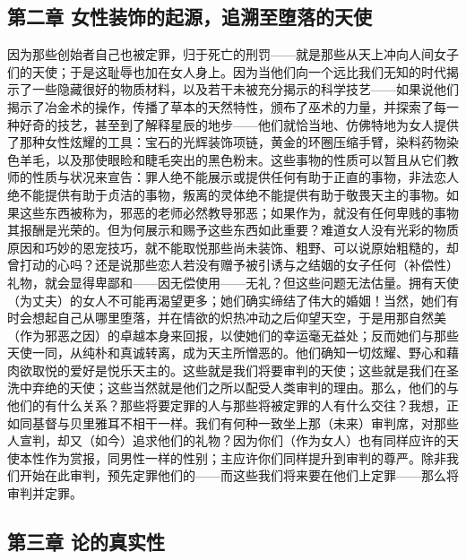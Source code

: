 \subsection{第二章 女性装饰的起源，追溯至堕落的天使}

因为那些创始者自己也被定罪，归于死亡的刑罚——就是那些从天上冲向人间女子们的天使；于是这耻辱也加在女人身上。因为当他们向一个远比我们无知的时代揭示了一些隐藏很好的物质材料，以及若干未被充分揭示的科学技艺——如果说他们揭示了冶金术的操作，传播了草本的天然特性，颁布了巫术的力量，并探索了每一种好奇的技艺，甚至到了解释星辰的地步——他们就恰当地、仿佛特地为女人提供了那种女性炫耀的工具：宝石的光辉装饰项链，黄金的环圈压缩手臂，染料药物染色羊毛，以及那使眼睑和睫毛突出的黑色粉末。这些事物的性质可以暂且从它们教师的性质与状况来宣告：罪人绝不能展示或提供任何有助于正直的事物，非法恋人绝不能提供有助于贞洁的事物，叛离的灵体绝不能提供有助于敬畏天主的事物。如果这些东西被称为，邪恶的老师必然教导邪恶；如果作为，就没有任何卑贱的事物其报酬是光荣的。但为何展示和赐予这些东西如此重要？难道女人没有光彩的物质原因和巧妙的恩宠技巧，就不能取悦那些尚未装饰、粗野、可以说原始粗糙的，却曾打动的心吗？还是说那些恋人若没有赠予被引诱与之结姻的女子任何（补偿性）礼物，就会显得卑鄙和——因无偿使用——无礼？但这些问题无法估量。拥有天使（为丈夫）的女人不可能再渴望更多；她们确实缔结了伟大的婚姻！当然，她们有时会想起自己从哪里堕落，并在情欲的炽热冲动之后仰望天空，于是用那自然美（作为邪恶之因）的卓越本身来回报，以使她们的幸运毫无益处；反而她们与那些天使一同，从纯朴和真诚转离，成为天主所憎恶的。他们确知一切炫耀、野心和藉肉欲取悦的爱好是悦乐天主的。这些就是我们将要审判的天使；这些就是我们在圣洗中弃绝的天使；这些当然就是他们之所以配受人类审判的理由。那么，他们的与他们的有什么关系？那些将要定罪的人与那些将被定罪的人有什么交往？我想，正如同基督与贝里雅耳不相干一样。我们有何种一致坐上那（未来）审判席，对那些人宣判，却又（如今）追求他们的礼物？因为你们（作为女人）也有同样应许的天使本性作为赏报，同男性一样的性别；主应许你们同样提升到审判的尊严。除非我们开始在此审判，预先定罪他们的——而这些我们将来要在他们上定罪——那么将审判并定罪。\par


\subsection{第三章 论的真实性}

